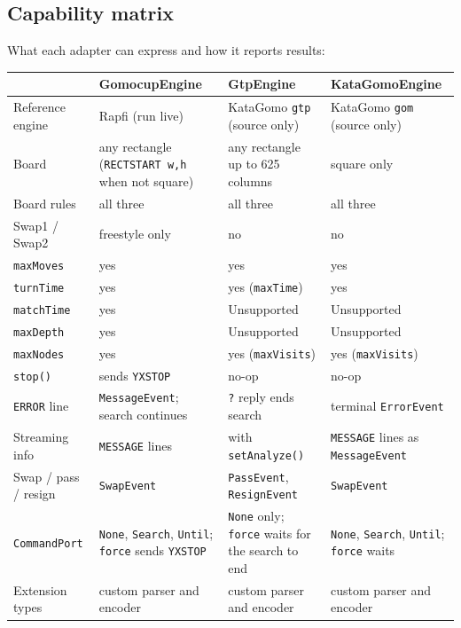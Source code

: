 \documentclass[11pt,a4paper]{article}
\newcommand{\code}[1]{\texttt{#1}}
\begin{document}
\subsection{Capability matrix}

What each adapter can express and how it reports results:

\begin{center}
\small
\begin{tabularx}{\textwidth}{@{}l X X X@{}}
\toprule
 & \textbf{GomocupEngine} & \textbf{GtpEngine} & \textbf{KataGomoEngine} \\
\midrule
Reference engine     & Rapfi (run live) & KataGomo \code{gtp} (source only) &
                       KataGomo \code{gom} (source only) \\
Board                & any rectangle (\code{RECTSTART w,h} when not square) & any rectangle up to
                       625 columns & square only \\
Board rules          & all three & all three & all three \\
Swap1 / Swap2        & freestyle only & no & no \\
\code{maxMoves}      & yes & yes & yes \\
\code{turnTime}      & yes & yes (\code{maxTime}) & yes \\
\code{matchTime}     & yes & Unsupported & Unsupported \\
\code{maxDepth}      & yes & Unsupported & Unsupported \\
\code{maxNodes}      & yes & yes (\code{maxVisits}) & yes (\code{maxVisits}) \\
\code{stop()}        & sends \code{YXSTOP} & no-op & no-op \\
\code{ERROR} line    & \code{MessageEvent}; search continues & \code{?} reply ends search &
                       terminal \code{ErrorEvent} \\
Streaming info       & \code{MESSAGE} lines & with \code{setAnalyze()} & \code{MESSAGE} lines as
                       \code{MessageEvent} \\
Swap / pass / resign & \code{SwapEvent} & \code{PassEvent}, \code{ResignEvent} & \code{SwapEvent} \\
\code{CommandPort}  & \code{None}, \code{Search}, \code{Until}; \code{force} sends \code{YXSTOP}
                       & \code{None} only; \code{force} waits for the search to end
                       & \code{None}, \code{Search}, \code{Until}; \code{force} waits \\
Extension types      & custom parser and encoder & custom parser and encoder & custom parser
                       and encoder \\
\bottomrule
\end{tabularx}
\end{center}
\end{document}
